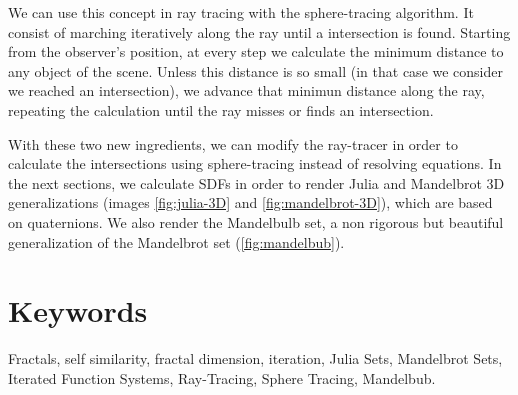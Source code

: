We can use this concept in ray tracing with the sphere-tracing algorithm. It consist of marching iteratively along the ray until a intersection is found. Starting from the observer's position, at every step we calculate the minimum distance to any object of the scene. Unless this distance is so small (in that case we consider we reached an intersection), we advance that minimun distance along the ray, repeating the calculation until the ray misses or finds an intersection.

With these two new ingredients, we can modify the ray-tracer in order to calculate the intersections using sphere-tracing instead of resolving equations. In the next sections, we calculate SDFs in order to render Julia and Mandelbrot 3D generalizations (images \ref{fig:julia-3D} and \ref{fig:mandelbrot-3D}), which are based on quaternions. We also render the Mandelbulb set, a non rigorous but beautiful generalization of the Mandelbrot set (\ref{fig:mandelbub}).

\section*{Keywords}

Fractals, self similarity, fractal dimension, iteration, Julia Sets, Mandelbrot Sets, Iterated Function Systems, Ray-Tracing, Sphere Tracing, Mandelbub. 